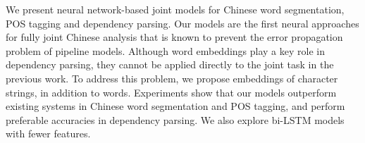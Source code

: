 We present neural network-based joint models for Chinese word segmentation, POS tagging and dependency parsing. Our models are the first neural approaches for fully joint Chinese analysis that is known to prevent the error propagation problem of pipeline models. Although word embeddings play a key role in dependency parsing, they cannot be applied directly to the joint task in the previous work. To address this problem, we propose embeddings of character strings, in addition to words. Experiments show that our models outperform existing systems in Chinese word segmentation and POS tagging, and perform preferable accuracies in dependency parsing. We also explore bi-LSTM models with fewer features.
